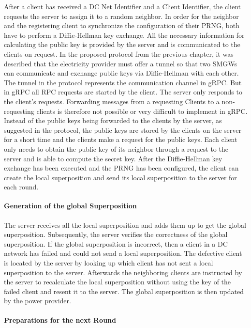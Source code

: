 After a client has received a DC Net Identifier and a Client Identifier, the client requests the server to assign it to a random neighbor. In order for the neighbor and the registering client to synchronize the configuration of their PRNG, both have to perform a Diffie-Hellman key exchange. All the necessary information for calculating the public key is provided by the server and is communicated to the clients on request. In the proposed protocol from the previous chapter, it was described that the electricity provider must offer a tunnel so that two SMGWs can communicate and exchange public keys via Diffie-Hellman with each other. The tunnel in the protocol represents the communication channel in gRPC. But in gRPC all RPC requests are started by the client. The server only responds to the client's requests. Forwarding messages from a requesting Clients to a non-requesting clients is therefore not possible or very difficult to implement in gRPC. Instead of the public keys being forwarded to the clients by the server, as suggested in the protocol, the public keys are stored by the clients on the server for a short time and the clients make a request for the public keys. 
Each client only needs to obtain the public key of its neighbor through a request to the server and is able to compute the secret key. After the Diffie-Hellman key exchange has been executed and the PRNG has been configured, the client can create the local superposition and send its local superposition to the server for each round. 
\\
\\
\textbf{Generation of the global Superposition}
\\
\\
The server receives all the local superposition and adds them up to get the global superposition. Subsequently, the server verifies the correctness of the global superposition. If the global superposition is incorrect, then a client in a DC network has failed and could not send a local superposition. The defective client is located by the server by looking up which client has not sent a local superposition to the server. Afterwards the neighboring clients are instructed by the server to recalculate the local superposition without using the key of the failed client and resent it to the server. The global superposition is then updated by the power provider. \\
\\
\textbf{Preparations for the next Round}
\\
\\
